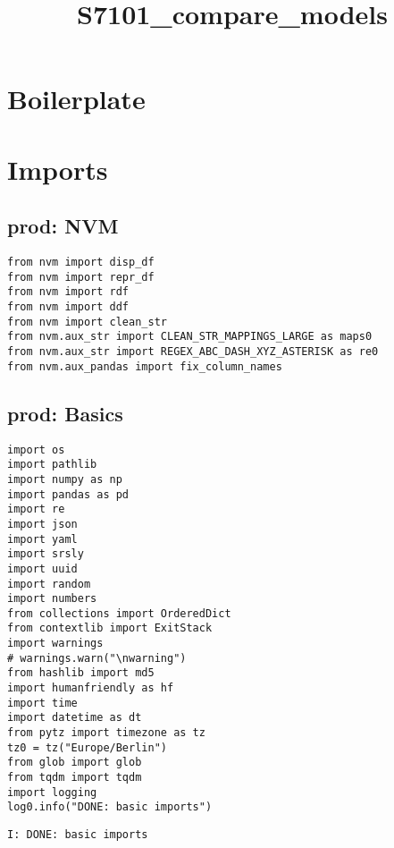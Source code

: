 \documentclass[a4paper,10pt,onecolumn,oneside,openright]{article}
\date{}
\title{S7101\_compare\_models}
\begin{document}
\maketitle

\section{Boilerplate}
\label{sec:orge4dde1e}
\section{Imports}
\label{sec:org0d0a45b}
\subsection{prod: NVM}
\label{sec:org2afca86}
\begin{verbatim}
from nvm import disp_df
from nvm import repr_df
from nvm import rdf
from nvm import ddf
from nvm import clean_str
from nvm.aux_str import CLEAN_STR_MAPPINGS_LARGE as maps0
from nvm.aux_str import REGEX_ABC_DASH_XYZ_ASTERISK as re0
from nvm.aux_pandas import fix_column_names
\end{verbatim}

\subsection{prod: Basics}
\label{sec:org3658a79}
\begin{verbatim}
import os
import pathlib
import numpy as np
import pandas as pd
import re
import json
import yaml
import srsly
import uuid
import random
import numbers
from collections import OrderedDict
from contextlib import ExitStack
import warnings
# warnings.warn("\nwarning")
from hashlib import md5
import humanfriendly as hf
import time
import datetime as dt
from pytz import timezone as tz
tz0 = tz("Europe/Berlin")
from glob import glob
from tqdm import tqdm
import logging
log0.info("DONE: basic imports")
\end{verbatim}

\begin{verbatim}
I: DONE: basic imports
\end{verbatim}
\end{document}
